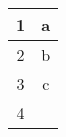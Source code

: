\begin{tabular}{ |c|c| }
 \hline
 1 & a \\ \hline
 2 & b \\ \hline
 3 & c \\ \hline
 4 &  \\ \hline
\end{tabular}